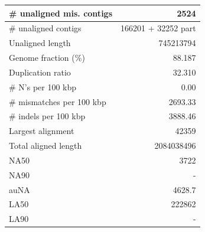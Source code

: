 \documentclass[12pt,a4paper]{article}
\begin{document}
\begin{table}[ht]
\begin{center}
\begin{tabular}{|l*{1}{|r}|}
\# unaligned mis. contigs & 2524 \\ \hline
\# unaligned contigs & 166201 + 32252 part \\ \hline
Unaligned length & 745213794 \\ \hline
Genome fraction (\%) & 88.187 \\ \hline
Duplication ratio & 32.310 \\ \hline
\# N's per 100 kbp & 0.00 \\ \hline
\# mismatches per 100 kbp & 2693.33 \\ \hline
\# indels per 100 kbp & 3888.46 \\ \hline
Largest alignment & 42359 \\ \hline
Total aligned length & 2084038496 \\ \hline
NA50 & 3722 \\ \hline
NA90 & - \\ \hline
auNA & 4628.7 \\ \hline
LA50 & 222862 \\ \hline
LA90 & - \\ \hline
\end{tabular}
\end{center}
\end{table}
\end{document}
